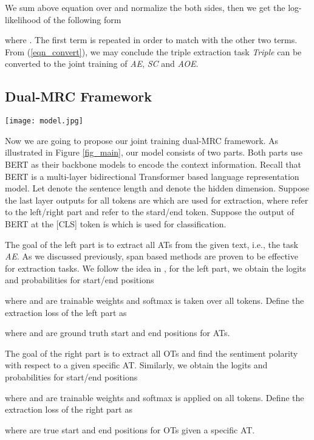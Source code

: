 \documentclass[letterpaper]{article} \usepackage{aaai21}  \usepackage{times}  \usepackage{helvet} \usepackage{courier}  \usepackage[hyphens]{url}  \usepackage{graphicx} \urlstyle{rm} \def\UrlFont{\rm}  \usepackage{natbib}  \usepackage{caption}
\begin{document}
We sum above equation over  and normalize the both sides, then we get
the log-likelihood of the following form

where . The first term is repeated in order to match with the other two terms.
From (\ref{eqn_convert}), we may conclude the triple extraction task \emph{Triple} can be converted to the joint training of \emph{AE}, \emph{SC} and \emph{AOE}.

\subsection{Dual-MRC Framework}
\begin{figure*}
    \centering
    \texttt{[image: model.jpg]}
    \caption{Proposed joint training dual-MRC framework.} \label{fig_main}
\end{figure*}
Now we are going to propose our joint training dual-MRC framework. 
As illustrated in Figure \ref{fig_main}, our model consists of two parts. 
Both parts use BERT \cite{devlin2019bert} as their backbone models to encode the context information. 
Recall that BERT is a multi-layer bidirectional Transformer based language representation model. Let  denote the sentence length and  denote the hidden dimension.
Suppose the last layer outputs for all tokens are  which are used for extraction, 
where  refer to the left/right part and  refer to the stard/end token. 
Suppose the output of BERT at the [CLS] token is  which is used for classification.  

The goal of the left part is to extract all ATs from the given text, i.e., the task \emph{AE}.
As we discussed previously, span based methods are proven to be effective for extraction tasks. 
We follow the idea in \cite{hu-etal-2019-open}, for the left part, we obtain the logits and probabilities for 
start/end positions 

where  and  are trainable weights and softmax is taken over all tokens. 
Define the extraction loss of the left part as  

where  and  are ground truth start and end positions for ATs.

The goal of the right part is to extract all OTs and find the sentiment polarity with respect to a given specific AT. 
Similarly, we obtain the logits and probabilities for 
start/end positions 

where  and  are trainable weights and softmax is applied on all tokens. 
Define the extraction loss of the right part as  

where  are true start and end positions for OTs given a specific AT.
\end{document}
